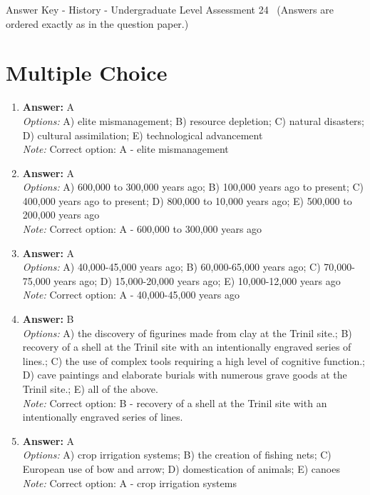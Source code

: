 \documentclass[12pt]{article}
\begin{document}
\begin{center}
Answer Key - History - Undergraduate Level Assessment 24 \
\small (Answers are ordered exactly as in the question paper.)
\end{center}

\section*{Multiple Choice}
\begin{enumerate}[label=\arabic*.]
\item \textbf{Answer:} A
\\ \textit{Options:} A) elite mismanagement; B) resource depletion; C) natural disasters; D) cultural assimilation; E) technological advancement
\\ \textit{Note:} Correct option: A - elite mismanagement
\item \textbf{Answer:} A
\\ \textit{Options:} A) 600,000 to 300,000 years ago; B) 100,000 years ago to present; C) 400,000 years ago to present; D) 800,000 to 10,000 years ago; E) 500,000 to 200,000 years ago
\\ \textit{Note:} Correct option: A - 600,000 to 300,000 years ago
\item \textbf{Answer:} A
\\ \textit{Options:} A) 40,000-45,000 years ago; B) 60,000-65,000 years ago; C) 70,000-75,000 years ago; D) 15,000-20,000 years ago; E) 10,000-12,000 years ago
\\ \textit{Note:} Correct option: A - 40,000-45,000 years ago
\item \textbf{Answer:} B
\\ \textit{Options:} A) the discovery of figurines made from clay at the Trinil site.; B) recovery of a shell at the Trinil site with an intentionally engraved series of lines.; C) the use of complex tools requiring a high level of cognitive function.; D) cave paintings and elaborate burials with numerous grave goods at the Trinil site.; E) all of the above.
\\ \textit{Note:} Correct option: B - recovery of a shell at the Trinil site with an intentionally engraved series of lines.
\item \textbf{Answer:} A
\\ \textit{Options:} A) crop irrigation systems; B) the creation of fishing nets; C) European use of bow and arrow; D) domestication of animals; E) canoes
\\ \textit{Note:} Correct option: A - crop irrigation systems
\end{enumerate}
\end{document}
